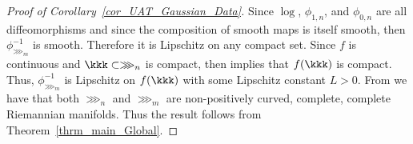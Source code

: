 \begin{proof}[{Proof of Corollary~\ref{cor_UAT_Gaussian_Data}}]
Since $\log$, $\phi_{1,n}$, and $\phi_{0,n}$ are all diffeomorphisms and since the composition of smooth maps is itself smooth, then $\phi_{\ggg_m}^{-1}$ is smooth.  Therefore it is Lipschitz on any compact set.  Since $f$ is continuous and $\kkk\subset \ggg_n$ is compact, then \citep[Theorem 26.5]{munkres2014topology} implies that $f(\kkk)$ is compact.  Thus, $\phi_{\ggg_m}^{-1}$ is Lipschitz on $f(\kkk)$ with some Lipschitz constant $L>0$.  
From \cite{GeometryOfMultivariateNormal_Lie_Canada} we have that both $\ggg_n$ and $\ggg_m$ are non-positively curved, complete, complete Riemannian manifolds.  Thus the result follows from Theorem~\ref{thrm_main_Global}.  
\end{proof}